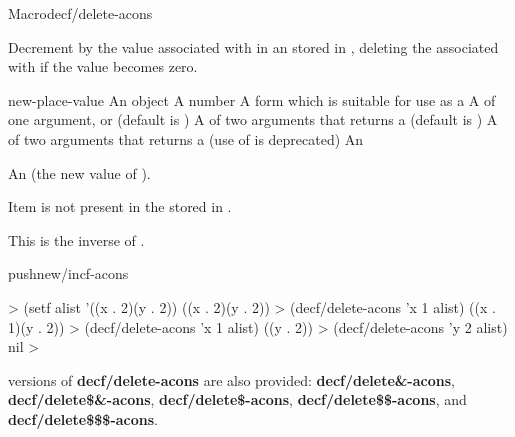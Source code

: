 \documentclass[10pt,twoside,english,pdftex]{article}
\begin{document}

\begin{functiondoc}{Macro}{decf/delete-acons}{
     
    \returns{} }
%
%
%
%
  
\fnsyntax

\fnpurpose Decrement by  the value associated with
 in an  stored in , deleting
the  associated with  if the value becomes zero.

\fnpackage {}

\fnmodule {}

\fnargs
\begin{args}{new-place-value}
\arg[item] An object
\arg[decrement] A number
\arg[place] A form which is suitable for use as a
\arg[key] A  of one argument, or \nil{} (default is \nil)
\arg[test] A  of two arguments that returns a
 (default is ) 
 A  of two arguments that returns a
 (use of  is deprecated)
 An  
\end{args}

\fnreturns An  (the new value of ). 

\fnerrors Item  is not present in the 
stored in .

\fndescription
This is the inverse of \textbf{}.

\begin{alsos}{pushnew/incf-acons}
\end{alsos}

\fnexamples
%
\W\supp
\begin{example}
  > (setf alist '((x . 2)(y . 2))
  ((x . 2)(y . 2))
  > (decf/delete-acons 'x 1 alist)
  ((x . 1)(y . 2))
  > (decf/delete-acons 'x 1 alist)
  ((y . 2))\goodpagebreak
  > (decf/delete-acons 'y 2 alist)
  nil
  >
\end{example}

\fnnote
%
%
%
%
%
%
%
 versions of
\textbf{decf/delete-acons} are also provided: \textbf{decf/delete\&-acons},
\textbf{decf/delete\$\&-acons}, \textbf{decf/delete\$-acons},
\textbf{decf/delete\$\$-acons}, and \textbf{decf/delete\$\$\$-acons}.

\end{functiondoc}
\end{document}
